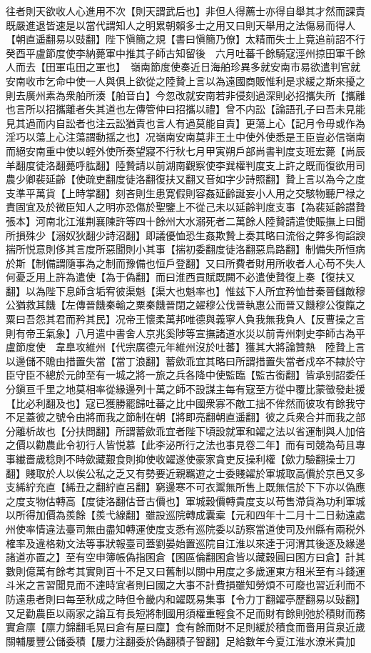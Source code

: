 往者則天欲收人心進用不次【則天謂武后也】非但人得薦士亦得自舉其才然而課責既嚴進退皆速是以當代謂知人之明累朝賴多士之用又曰則天舉用之法傷易而得人【朝直遥翻易以豉翻】陛下愼簡之規【書曰愼簡乃僚】太精而失士上竟追前詔不行　癸酉平盧節度使李納薨軍中推其子師古知留後　六月吐蕃千餘騎寇涇州掠田軍千餘人而去【田軍屯田之軍也】　嶺南節度使奏近日海舶珍異多就安南市易欲遣判官就安南收市乞命中使一人與俱上欲從之陸贄上言以為遠國商販惟利是求緩之斯來擾之則去廣州素為衆舶所湊【舶音白】今忽改就安南若非侵刻過深則必招攜失所【攜離也言所以招攜離者失其道也左傳管仲曰招攜以禮】曾不内訟【論語孔子曰吾未見能見其過而内自訟者也注云訟猶責也言人有過莫能自責】更蕩上心【記月令毋或作為淫巧以蕩上心注蕩謂動揺之也】况嶺南安南莫非王土中使外使悉是王臣豈必信嶺南而絕安南重中使以輕外使所奏望寢不行秋七月甲寅朔戶部尚書判度支班宏薨【尚辰羊翻度徒洛翻薨呼肱翻】陸贄請以前湖南觀察使李巽權判度支上許之既而復欲用司農少卿裴延齡【使疏吏翻度徒洛翻復扶又翻又音如字少詩照翻】贄上言以為今之度支準平萬貨【上時掌翻】刻吝則生患寛假則容姦延齡誕妄小人用之交駭物聽尸禄之責固宜及於微臣知人之明亦恐傷於聖鑒上不從己未以延齡判度支事【為裴延齡譛贄張本】河南北江淮荆襄陳許等四十餘州大水溺死者二萬餘人陸贄請遣使賑撫上曰聞所損殊少【溺奴狄翻少詩沼翻】即議優恤恐生姦欺贄上奏其略曰流俗之弊多徇諂諛揣所悦意則侈其言度所惡聞則小其事【揣初委翻度徒洛翻惡烏路翻】制備失所恒病於斯【制備謂隨事為之制而豫備也恒戶登翻】又曰所費者財用所收者人心苟不失人何憂乏用上許為遣使【為于偽翻】而曰淮西貢賦既闕不必遣使贄復上奏【復扶又翻】以為陛下息師含垢宥彼渠魁【渠大也魁率也】惟兹下人所宜矜恤昔秦晉讎敵穆公猶救其饑【左傳晉饑秦輸之粟秦饑晉閉之糴穆公伐晉執惠公而晉又饑穆公復餼之粟曰吾怨其君而矜其民】况帝王懷柔萬邦唯德與義寧人負我無我負人【反曹操之言則有帝王氣象】八月遣中書舍人京兆奚陟等宣撫諸道水災以前青州刺史李師古為平盧節度使　韋臯攻維州【代宗廣德元年維州沒於吐蕃】獲其大將論贊熱　陸贄上言以邊儲不贍由措置失當【當丁浪翻】蓄歛乖宜其略曰所謂措置失當者戍卒不隸於守臣守臣不總於元帥至有一城之將一旅之兵各降中使監臨【監古銜翻】皆承别詔委任分鎭亘千里之地莫相率從緣邊列十萬之師不設謀主每有寇至方從中覆比蒙徵發赴援【比必利翻及也】寇已獲勝罷歸吐蕃之比中國衆寡不敵工拙不侔然而彼攻有餘我守不足蓋彼之號令由將而我之節制在朝【將即亮翻朝直遥翻】彼之兵衆合并而我之部分離析故也【分扶問翻】所謂蓄歛乖宜者陛下頃設就軍和糴之法以省運制與人加倍之價以勸農此令初行人皆悦慕【此李泌所行之法也事見卷二年】而有司競為苟且專事纎嗇歲稔則不時歛藏艱食則抑使收糴遂使豪家貪吏反操利權【歛力驗翻操士刀翻】賤取於人以俟公私之乏又有勢要近親羈遊之士委賤糴於軍城取高價於京邑又多支絺紵充直【絺丑之翻紵直呂翻】窮邊寒不可衣鬻無所售上既無信於下下亦以偽應之度支物估轉高【度徒洛翻估音古價也】軍城穀價轉貴度支以苟售滯貨為功利軍城以所得加價為羨餘【羨弋線翻】雖設巡院轉成囊槖【元和四年十二月十二日勑遠處州使率情違法臺司無由盡知轉運使度支悉有巡院委以訪察當道使司及州縣有兩税外榷率及違格勑文法等事狀報臺司蓋劉晏始置巡院自江淮以來達于河渭其後逐及緣邊諸道亦置之】至有空申簿帳偽指囷倉【囷區倫翻囷倉皆以藏穀圓曰囷方曰倉】計其數則億萬有餘考其實則百十不足又曰舊制以關中用度之多歲運東方租米至有斗錢運斗米之言習聞見而不達時宜者則曰國之大事不計費損雖知勞煩不可廢也習近利而不防遠患者則曰每至秋成之時但令畿内和糴既易集事【令力丁翻糴亭歷翻易以䜴翻】又足勸農臣以兩家之論互有長短將制國用須權重輕食不足而財有餘則弛於積財而務實倉廪【廪力錦翻毛晃曰倉有屋曰廩】食有餘而財不足則緩於積食而嗇用貨泉近歲關輔屢豐公儲委積【屢力注翻委於偽翻積子智翻】足給數年今夏江淮水潦米貴加